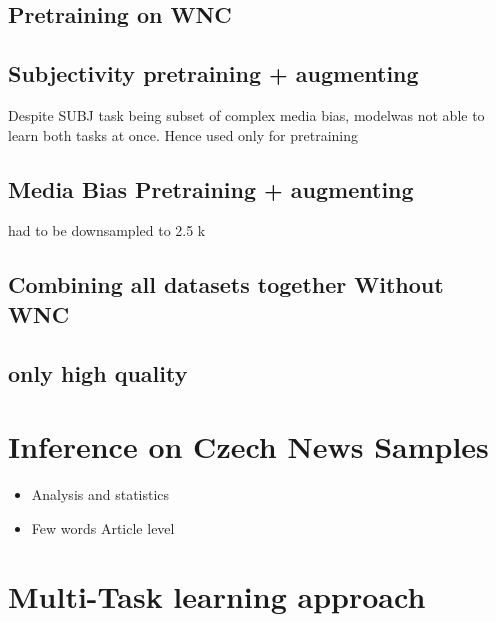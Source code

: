  \subsection{Pretraining on WNC}
 \subsection{Subjectivity pretraining + augmenting}
 Despite SUBJ task being subset of complex media bias, modelwas not able to learn both tasks at once. Hence used only for pretraining
 \subsection{Media Bias Pretraining + augmenting }
 had to be downsampled to 2.5 k
 \subsection{Combining all datasets together Without WNC}
 \subsection{only high quality}

 
 
 
 
\section{Inference on Czech News Samples}
\begin{itemize}
    \item Analysis and statistics
    \item Few words Article level
\end{itemize}


\section{Multi-Task learning approach}\label{mtl}